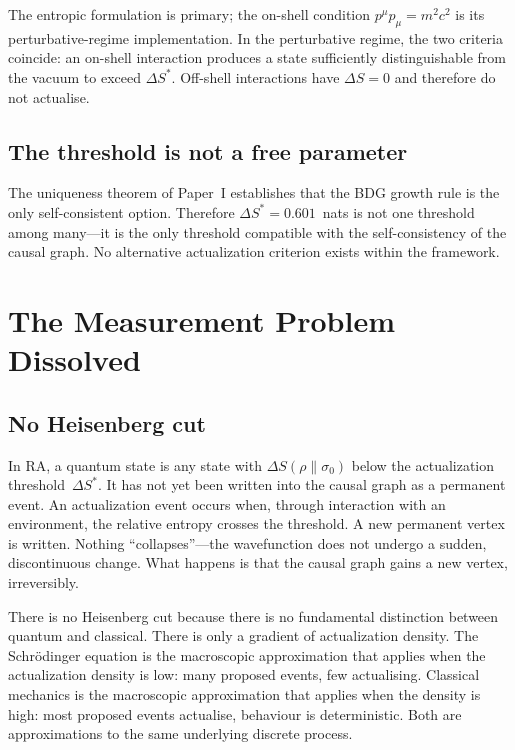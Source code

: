 \documentclass[11pt,a4paper]{article}
\theoremstyle{plain}
\theoremstyle{definition}
\theoremstyle{remark}
\begin{document}
The entropic formulation is primary; the on-shell condition
$p^\mu p_\mu = m^2 c^2$ is its perturbative-regime implementation.  In the
perturbative regime, the two criteria coincide: an on-shell interaction produces a
state sufficiently distinguishable from the vacuum to exceed $\Delta S^*$.  Off-shell
interactions have $\Delta S = 0$ and therefore do not actualise.

\subsection{The threshold is not a free parameter}\label{sec:notfree}

The uniqueness theorem of Paper~I establishes that the BDG growth rule is the only
self-consistent option.  Therefore $\Delta S^* = 0.601$~nats is not one threshold
among many---it is the only threshold compatible with the self-consistency of the
causal graph.  No alternative actualization criterion exists within the framework.

\section{The Measurement Problem Dissolved}\label{sec:measurement}

\subsection{No Heisenberg cut}\label{sec:nocut}

In RA, a quantum state is any state with $\Delta S(\rho\|\sigma_0)$ below the
actualization threshold~$\Delta S^*$.  It has not yet been written into the causal
graph as a permanent event.  An actualization event occurs when, through interaction
with an environment, the relative entropy crosses the threshold.  A new permanent
vertex is written.  Nothing ``collapses''---the wavefunction does not undergo a
sudden, discontinuous change.  What happens is that the causal graph gains a new
vertex, irreversibly.

There is no Heisenberg cut because there is no fundamental distinction between
quantum and classical.  There is only a gradient of actualization density.  The
Schr\"odinger equation is the macroscopic approximation that applies when the
actualization density is low: many proposed events, few actualising.  Classical
mechanics is the macroscopic approximation that applies when the density is high:
most proposed events actualise, behaviour is deterministic.  Both are approximations
to the same underlying discrete process.
\end{document}
